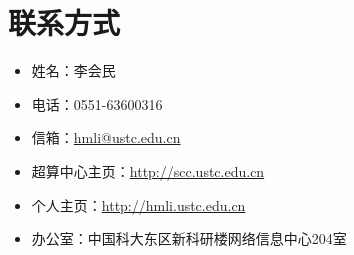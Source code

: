 \part{联系方式}
\begin{itemize}
	\item 姓名：李会民
    \item 电话：0551-63600316
    \item 信箱：\href{mailto:hmli@ustc.edu.cn}{hmli@ustc.edu.cn}
    \item 超算中心主页：\url{http://scc.ustc.edu.cn}
    \item 个人主页：\url{http://hmli.ustc.edu.cn}
	\item 办公室：中国科大东区新科研楼网络信息中心204室
\end{itemize}

